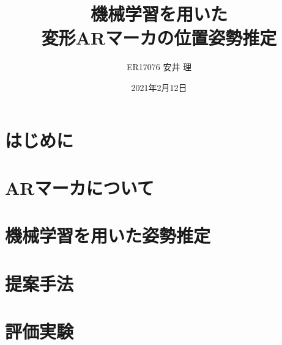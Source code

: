 \documentclass{graduation}
\begin{document}
\title{
機械学習を用いた\\
変形ARマーカの位置姿勢推定
}
\author{ER17076 安井 理}
\date{2021年2月12日} %

\frontmatter
\maketitle

\setcounter{page}{1}
\chapter*{はじめに}
\label{chap:introduction}



\tableofcontents

\listoffigures
\listoftables


\mainmatter

\chapter{ARマーカについて}
\label{chap:1}


\chapter{機械学習を用いた姿勢推定}
\label{chap:2}



\chapter{提案手法}
\label{chap:3}



\chapter{評価実験}
\label{chap:4}

\end{document}
